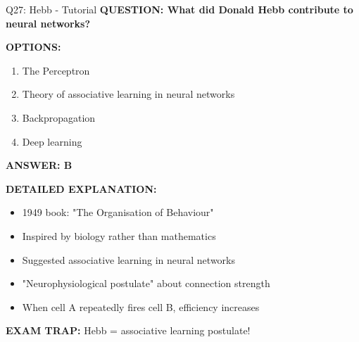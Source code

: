 \documentclass[8pt]{beamer}
\begin{document}
	\begin{frame}{Q27: Hebb - Tutorial}
		\fontsize{6.5}{7.5}\selectfont
		\textbf{QUESTION: What did Donald Hebb contribute to neural networks?}
		
		\vspace{0.1cm}
		\textbf{OPTIONS:}
		\begin{enumerate}
			\item The Perceptron
			\item Theory of associative learning in neural networks
			\item Backpropagation
			\item Deep learning
		\end{enumerate}
		
		\vspace{0.1cm}
		\textcolor{myblue}{\textbf{ANSWER: B}}
		
		\vspace{0.1cm}
		\textbf{DETAILED EXPLANATION:}
		\begin{itemize}
			\item 1949 book: "The Organisation of Behaviour"
			\item Inspired by biology rather than mathematics
			\item Suggested associative learning in neural networks
			\item "Neurophysiological postulate" about connection strength
			\item When cell A repeatedly fires cell B, efficiency increases
		\end{itemize}
		
		\vspace{0.1cm}
		\textcolor{myred}{\textbf{EXAM TRAP:}} Hebb = \textcolor{myblue}{associative learning postulate}!
	\end{frame}
	
\end{document}
